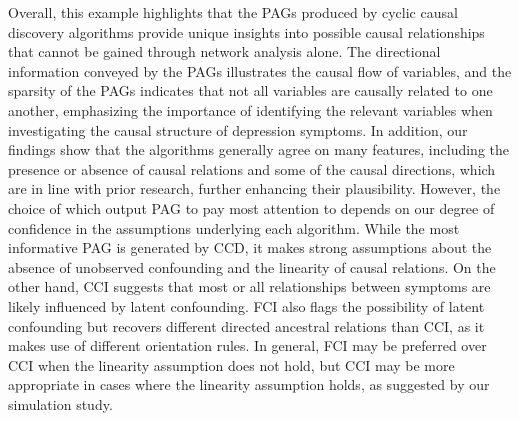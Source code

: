 \documentclass[twoside, 11pt]{article}
\begin{document}
Overall, this example highlights that the PAGs produced by cyclic causal discovery algorithms provide unique insights into possible causal relationships that cannot be gained through network analysis alone. 
The directional information conveyed by the PAGs illustrates the causal flow of variables, and the sparsity of the PAGs indicates that not all variables are causally related to one another, emphasizing the importance of identifying the relevant variables when investigating the causal structure of depression symptoms.
In addition, our findings show that the algorithms generally agree on many features, including the presence or absence of causal relations and some of the causal directions, which are in line with prior research, further enhancing their plausibility.
However, the choice of which output PAG to pay most attention to depends on our degree of confidence in the assumptions underlying each algorithm. While the most informative PAG is generated by CCD, it makes strong assumptions about the absence of unobserved confounding and the linearity of causal relations. On the other hand, CCI suggests that most or all relationships between symptoms are likely influenced by latent confounding. FCI also flags the possibility of latent confounding but recovers different directed ancestral relations than CCI, as it makes use of different orientation rules. In general, FCI may be preferred over CCI when the linearity assumption does not hold, but CCI may be more appropriate in cases where the linearity assumption holds, as suggested by our simulation study. 
\end{document}
